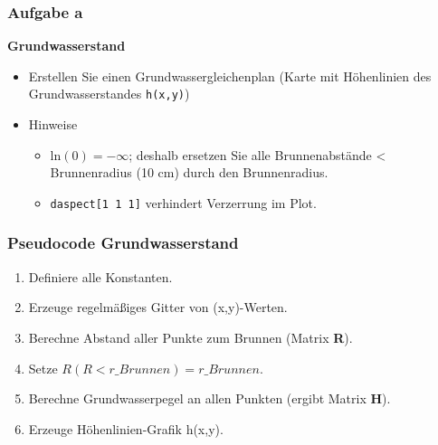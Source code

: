  \begin{frame}
		\frametitle{Aufgabe a}
          \begin{exercise}
              \sloppy          
              \textbf{Grundwasserstand}
              \begin{itemize}
                \item Erstellen Sie einen Grundwassergleichenplan (Karte mit Höhenlinien des Grundwasserstandes \texttt{h(x,y)})
				\item Hinweise
				\begin{itemize}
					\item ln$\left(0\right)= -\infty$; deshalb ersetzen Sie alle Brunnenabstände < Brunnenradius (10 cm) durch den Brunnenradius. 
					\item \texttt{daspect[1 1 1]} verhindert Verzerrung im Plot.
				\end{itemize}
              \end{itemize}
          \end{exercise}
      \end{frame}

\begin{frame}
		\frametitle{Pseudocode Grundwasserstand}
		\begin{enumerate}
			\item Definiere alle Konstanten.
			\item Erzeuge regelmäßiges Gitter von (x,y)-Werten.
			\item Berechne Abstand aller Punkte zum Brunnen (Matrix \textbf{R}).
			\item Setze $R(R<r\_Brunnen)=r\_Brunnen$.
			\item Berechne Grundwasserpegel an allen Punkten (ergibt Matrix \textbf{H}).
			\item Erzeuge Höhenlinien-Grafik h(x,y).

		\end{enumerate}
			
   	\end{frame}


